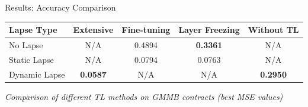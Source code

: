     \begin{frame}{Results: Accuracy Comparison}
    \begin{table}
    \begin{tabular}{lcccc}
    \toprule
    \textbf{Lapse Type} & \textbf{Extensive} & \textbf{Fine-tuning} & \textbf{Layer Freezing} & \textbf{Without TL} \\
    \midrule
    No Lapse & N/A & 0.4894 & \textbf{0.3361} & N/A \\
    Static Lapse & N/A & 0.0794 & 0.0763 & N/A \\
    Dynamic Lapse & \textbf{0.0587} & N/A & N/A & \textbf{0.2950} \\
    \bottomrule
    \end{tabular}
    \end{table}
    
    \textit{Comparison of different TL methods on GMMB contracts (best MSE values)}
    \end{frame}
    
